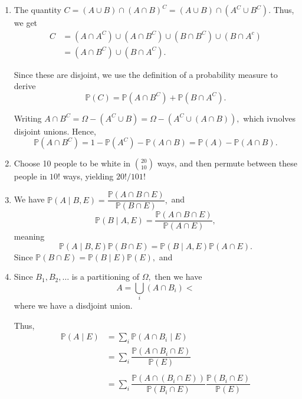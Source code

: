 \documentclass[12pt]{article}
\begin{document}
\begin{enumerate}
  \item The quantity $C = (A \cup B)  \cap (A \cap B)^C  = (A \cup B)
    \cap (A^C \cup B^C).$ Thus, we get
    \begin{align*}
      C &= (A \cap A^C) \cup (A \cap B^C) \cup (B \cap B^C)  \cup (B
      \cap A^c) \\
      &= (A \cap B^C) \cup (B \cap A^C).
    \end{align*}

    Since these are disjoint, we use the definition of a probability
    measure to derive
    $$
    \mathbb P(C) = \mathbb P(A \cap B^C) + \mathbb P(B \cap A^C).
    $$

    Writing $A\cap B^C = \Omega - (A^C \cup B) = \Omega - (A^C \cup
    (A \cap B)),$ which ivnolves disjoint unions. Hence,
    $$
    \mathbb P(A \cap B^C) = 1 - \mathbb P(A^C) - \mathbb P(A \cap B)
    = \mathbb P(A) - \mathbb P(A \cap B).
    $$

  \item Choose 10 people to be white in $20 \choose 10$ ways, and
    then permute between these people in $10!$ ways, yielding $20!/101!$

  \item We have $\mathbb P(A \mid B, E) = \dfrac{\mathbb P(A \cap B
    \cap E)}{\mathbb P(B \cap E)},$ and $$
    \mathbb P(B \mid A, E) = \dfrac{\mathbb P(A \cap B \cap
    E)}{\mathbb P(A \cap E)},
    $$
    meaning
    $$
    \mathbb P(A \mid B, E) \mathbb P(B \cap E) = \mathbb P(B \mid A,
    E) \mathbb P(A \cap E).
    $$
    Since $\mathbb P(B \cap  E) = \mathbb P(B \mid E) \mathbb P(E),$ and
    $$$$

  \item Since $B_1, B_2, \ldots$ is a partitioning of $\Omega,$ then we have
    $$
    A = \bigcup_{i} (A \cap B_i) <
    $$
    where we have a disdjoint union.

    Thus,
    \begin{align*}
      \mathbb P(A \mid E) &= \sum_{i} \mathbb P(A \cap B_i \mid E) \\
      &= \sum_{i} \dfrac{\mathbb P(A \cap B_i \cap E)}{\mathbb P(E)} \\ \\
      &= \sum_{i} \dfrac{\mathbb P(A \cap (B_i \cap E))}{\mathbb
      P(B_i \cap E)} \dfrac{\mathbb P(B_i \cap E)}{\mathbb P(E)}
    \end{align*}
\end{enumerate}
\end{document}
